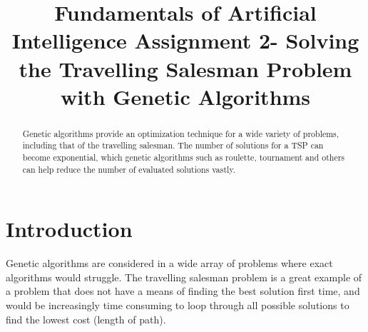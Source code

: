 \documentclass[article]{IEEEtran}
\begin{document}
\title{Fundamentals of Artificial Intelligence Assignment 2- Solving the Travelling Salesman Problem with Genetic Algorithms}

\author{
}

\maketitle

\begin{abstract}
Genetic algorithms provide an optimization technique for a wide variety of problems, including that of the travelling salesman. The number of solutions for a TSP can become exponential, which genetic algorithms such as roulette, tournament and others can help reduce the number of evaluated solutions vastly. 
\end{abstract}

\section{Introduction}
Genetic algorithms are considered in a wide array of problems where exact algorithms would struggle. The travelling salesman problem is a great example of a problem that does not have a means of finding the best solution first time, and would be increasingly time consuming to loop through all possible solutions to find the lowest cost (length of path).
\end{document}

